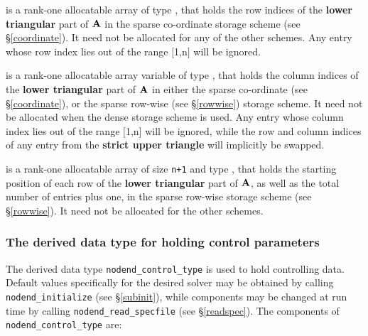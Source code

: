 \documentclass{galahad}
\newcommand{\packagename}{nodend}
\begin{document}
\begin{description}
 is a rank-one allocatable array of type \integer,
that holds the row indices of the {\bf lower triangular} part of ${\mathbf{A}}$
in the sparse co-ordinate storage
scheme (see \S\ref{coordinate}).
It need not be allocated for any of the other schemes.
Any entry whose row index lies out of the range $[$1,n$]$ will be ignored.

 is a rank-one allocatable array variable of type \integer,
that holds the column indices of the {\bf lower triangular} part of
${\mathbf{A}}$ in either the sparse co-ordinate
(see \S\ref{coordinate}), or the sparse row-wise
(see \S\ref{rowwise}) storage scheme.
It need not be allocated when the dense
storage scheme is used.
Any entry whose column index lies out of the range $[$1,n$]$ will be ignored,
while the row and column indices of any entry from the
{\bf strict upper triangle} will implicitly be swapped.

 is a rank-one allocatable array of size {\tt n+1} and type
\integer, that holds the starting position of
each row of the {\bf lower triangular} part of ${\mathbf{A}}$, as well
as the total number of entries plus one, in the sparse row-wise storage
scheme (see \S\ref{rowwise}). It need not be allocated for the
other schemes.

\end{description}


\subsubsection{The derived data type for holding control
 parameters}\label{typecontrol}
The derived data type
{\tt \packagename\_control\_type}
is used to hold controlling data.
Default values specifically for the desired solver
may be obtained by calling
{\tt \packagename\_initialize}
(see \S\ref{subinit}),
while components may be changed at run time by calling
{\tt \packagename\_read\-\_specfile}
(see \S\ref{readspec}).
The components of
{\tt \packagename\_control\_type}
are:
\end{document}
